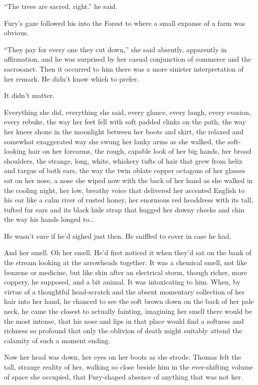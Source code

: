 \documentclass[11pt,a5paper]{article}
\begin{document}
``The trees are sacred, right.'' he said.

Fury's gaze followed his into the Forest to where a small expanse of a farm was obvious.

``They pay for every one they cut down,'' she said absently, apparently in affirmation, and he was surprised by her casual conjunction of commerce and the sacrosanct. Then it occurred to him there was a more sinister interpretation of her remark. He didn't know which to prefer.

It didn't matter.

Everything she did, everything she said, every glance, every laugh, every evasion, every rebuke, the way her feet fell with soft padded clinks on the path, the way her knees shone in the moonlight between her boots and skirt, the relaxed and somewhat exaggerated way she swung her lanky arms as she walked, the soft-looking hair on her forearms, the rough, capable look of her big hands, her broad shoulders, the strange, long, white, whiskery tufts of hair that grew from helix and targus of both ears, the way the twin oblate copper octagons of her glasses sat on her nose, a nose she wiped now with the back of her hand as she walked in the cooling night, her low, breathy voice that delivered her accented English to his ear like a calm river of rusted honey, her enormous red headdress with its tall, tufted fur ears and its black hide strap that hugged her downy cheeks and chin the way his hands longed to...

He wasn't sure if he'd sighed just then. He sniffled to cover in case he had.

And her smell. Oh her smell. He'd first noticed it when they'd sat on the bank of the stream looking at the arrowheads together. It was a chemical smell, not like benzene or medicine, but like skin after an electrical storm, though richer, more coppery, he supposed, and a bit animal. It was intoxicating to him. When, by virtue of a thoughtful head-scratch and the absent momentary collection of her hair into her hand, he chanced to see the soft brown down on the back of her pale neck, he came the closest to actually fainting, imagining her smell there would be the most intense, that his nose and lips in that place would find a softness and richness so profound that only the oblivion of death might suitably attend the calamity of such a moment ending.

Now her head was down, her eyes on her boots as she strode. Thomas felt the tall, strange reality of her, walking so close beside him in the ever-shifting volume of space she occupied, that Fury-shaped absence of anything that was not her.
\end{document}
